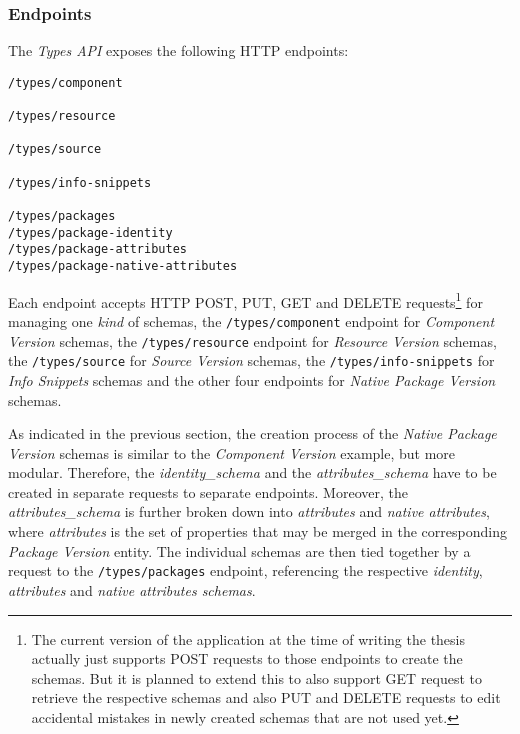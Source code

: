 \subsubsection{Endpoints}
The \emph{Types API} exposes the following HTTP endpoints:

\begin{lstlisting}[basicstyle=\tiny, caption=Types API Endpoints, captionpos=b, label=lst:TypesEndpoints]
/types/component

/types/resource

/types/source

/types/info-snippets

/types/packages
/types/package-identity
/types/package-attributes
/types/package-native-attributes
\end{lstlisting}

Each endpoint accepts HTTP POST, PUT, GET and DELETE requests\footnote{The current version of the application at the time of writing the thesis actually just supports POST requests to those endpoints to create the schemas. But it is planned to extend this to also support GET request to retrieve the respective schemas and also PUT and DELETE requests to edit accidental mistakes in newly created schemas that are not used yet.} for managing one \emph{kind} of schemas, the \lstinline|/types/component| endpoint for \emph{Component Version} schemas, the \lstinline|/types/resource| endpoint for \emph{Resource Version} schemas, the \lstinline|/types/source| for \emph{Source Version} schemas, the \lstinline|/types/info-snippets| for \emph{Info Snippets} schemas and the other four endpoints for \emph{Native Package Version} schemas.\par
As indicated in the previous section, the creation process of the \emph{Native Package Version} schemas is similar to the \emph{Component Version} example, but more modular. Therefore, the \emph{identity\_schema} and the \emph{attributes\_schema} have to be created in separate requests to separate endpoints. Moreover, the \emph{attributes\_schema} is further broken down into \emph{attributes} and \emph{native attributes}, where \emph{attributes} is the set of properties that may be merged in the corresponding \emph{Package Version} entity. The individual schemas are then tied together by a request to the \lstinline|/types/packages| endpoint, referencing the respective \emph{identity}, \emph{attributes} and \emph{native attributes schemas}.\\

